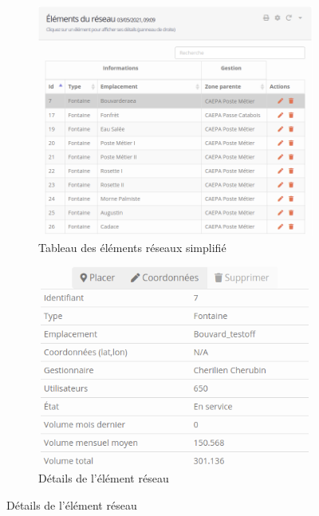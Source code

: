 \documentclass{EPL-master-thesis-covers-FR}
\begin{document}
				\begin{figure}[H]
					\begin{subfigure}[b]{0.5\textwidth}
  						\includegraphics[width=1\linewidth]{images/map_tab1}
  						\caption{Tableau des éléments réseaux simplifié}
					\end{subfigure}%
					\begin{subfigure}[b]{0.5\textwidth}
  						\includegraphics[width=1\linewidth]{images/map_tab2}
  						\caption{Détails de l'élément réseau}
					\end{subfigure}
					\label{fig:test}
				\end{figure}
				
\end{document}
